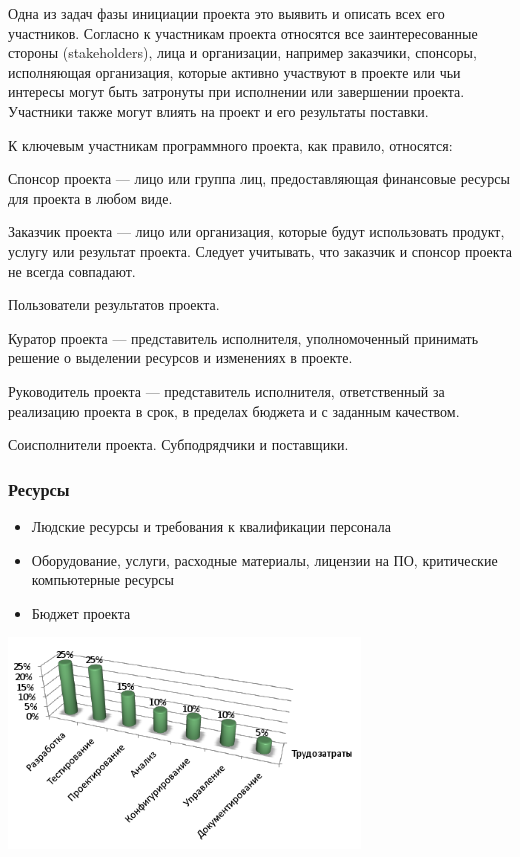 \documentclass{../industrial-development}
\begin{document}
Одна из задач фазы инициации проекта это выявить и описать всех его участников. Согласно к участникам проекта относятся все заинтересованные стороны (stakeholders), лица и организации, например заказчики, спонсоры, исполняющая организация, которые активно участвуют в проекте или чьи интересы могут быть затронуты при исполнении или завершении проекта. Участники также могут влиять на проект и его результаты поставки.

К ключевым участникам программного проекта, как правило, относятся:

Спонсор проекта — лицо или группа лиц, предоставляющая финансовые ресурсы для проекта в любом виде.

Заказчик проекта — лицо или организация, которые будут использовать продукт, услугу или результат проекта. Следует учитывать, что заказчик и спонсор проекта не всегда совпадают.

Пользователи результатов проекта.

Куратор проекта — представитель исполнителя, уполномоченный принимать решение о выделении ресурсов и изменениях в проекте.

Руководитель проекта — представитель исполнителя, ответственный за реализацию проекта в срок, в пределах бюджета и с заданным качеством.

Соисполнители проекта. Субподрядчики и поставщики.

    \begin{frame} \frametitle{Ресурсы}
	\begin{itemize}
		\item Людские ресурсы и требования к квалификации персонала
		\item Оборудование, услуги, расходные материалы, лицензии на ПО, критические компьютерные ресурсы
		\item Бюджет проекта
	\end{itemize}
         \centerline{\includegraphics[width=0.7\textwidth]{ress.png}}
    \end{frame}
    \lecturenotes
\end{document}
